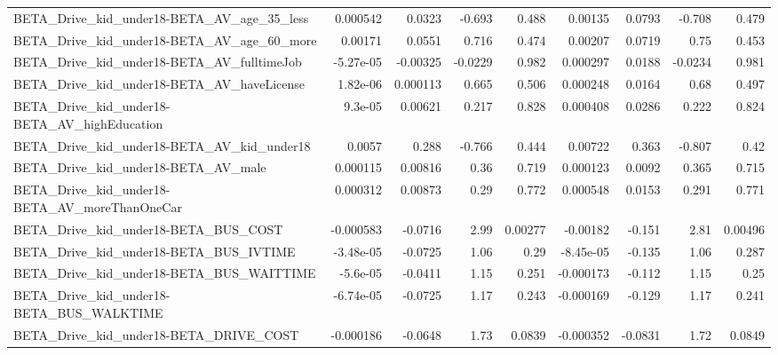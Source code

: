 \begin{tabular}{lrrrrrrrr}
BETA\_Drive\_kid\_under18-BETA\_AV\_age\_35\_less         &    0.000542 &       0.0323 &   -0.693 &    0.488 &    0.00135 &      0.0793 &       -0.708 &         0.479 \\
BETA\_Drive\_kid\_under18-BETA\_AV\_age\_60\_more         &     0.00171 &       0.0551 &    0.716 &    0.474 &    0.00207 &      0.0719 &         0.75 &         0.453 \\
BETA\_Drive\_kid\_under18-BETA\_AV\_fulltimeJob         &   -5.27e-05 &     -0.00325 &  -0.0229 &    0.982 &   0.000297 &      0.0188 &      -0.0234 &         0.981 \\
BETA\_Drive\_kid\_under18-BETA\_AV\_haveLicense         &    1.82e-06 &     0.000113 &    0.665 &    0.506 &   0.000248 &      0.0164 &         0.68 &         0.497 \\
BETA\_Drive\_kid\_under18-BETA\_AV\_highEducation       &     9.3e-05 &      0.00621 &    0.217 &    0.828 &   0.000408 &      0.0286 &        0.222 &         0.824 \\
BETA\_Drive\_kid\_under18-BETA\_AV\_kid\_under18         &      0.0057 &        0.288 &   -0.766 &    0.444 &    0.00722 &       0.363 &       -0.807 &          0.42 \\
BETA\_Drive\_kid\_under18-BETA\_AV\_male                &    0.000115 &      0.00816 &     0.36 &    0.719 &   0.000123 &      0.0092 &        0.365 &         0.715 \\
BETA\_Drive\_kid\_under18-BETA\_AV\_moreThanOneCar      &    0.000312 &      0.00873 &     0.29 &    0.772 &   0.000548 &      0.0153 &        0.291 &         0.771 \\
BETA\_Drive\_kid\_under18-BETA\_BUS\_COST               &   -0.000583 &      -0.0716 &     2.99 &  0.00277 &   -0.00182 &      -0.151 &         2.81 &       0.00496 \\
BETA\_Drive\_kid\_under18-BETA\_BUS\_IVTIME             &   -3.48e-05 &      -0.0725 &     1.06 &     0.29 &  -8.45e-05 &      -0.135 &         1.06 &         0.287 \\
BETA\_Drive\_kid\_under18-BETA\_BUS\_WAITTIME           &    -5.6e-05 &      -0.0411 &     1.15 &    0.251 &  -0.000173 &      -0.112 &         1.15 &          0.25 \\
BETA\_Drive\_kid\_under18-BETA\_BUS\_WALKTIME           &   -6.74e-05 &      -0.0725 &     1.17 &    0.243 &  -0.000169 &      -0.129 &         1.17 &         0.241 \\
BETA\_Drive\_kid\_under18-BETA\_DRIVE\_COST             &   -0.000186 &      -0.0648 &     1.73 &   0.0839 &  -0.000352 &     -0.0831 &         1.72 &        0.0849 \\

\end{tabular}
